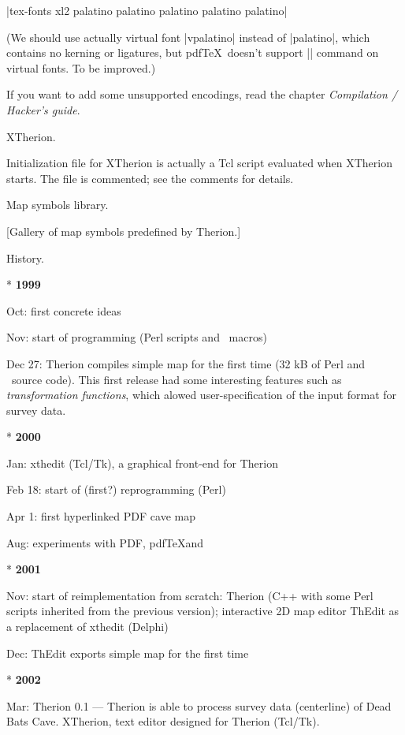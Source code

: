   |tex-fonts xl2 palatino palatino palatino palatino palatino|
  
  (We should use actually virtual font |vpalatino| instead of |palatino|,
  which contains no kerning or ligatures, but
  pdf\TeX\ doesn't support |\pdfincludechars| command on virtual fonts.
  To be improved.)
    
  If you want to add some unsupported encodings, 
  read the chapter {\it Compilation / Hacker's guide}. 
\endlist


\subsubchapter XTherion.

Initialization file for XTherion is actually a Tcl script evaluated when 
XTherion starts. The file is commented; see the comments for details.


%


\subchapter Map symbols library.

[Gallery of map symbols predefined by Therion.]


\subchapter History.

\list
{}
* {\bf 1999}

  Oct: first concrete ideas

  Nov: start of programming (Perl scripts and \MP\ macros)

  Dec 27: Therion compiles simple map for the first time (32 kB of Perl and 
       \MP\ source code). This first release had some interesting features
       such as {\it transformation functions}, which alowed user-specification
       of the input format for survey data.
				
* {\bf 2000}

  Jan: xthedit (Tcl/Tk), a graphical front-end for Therion

  Feb 18: start of (first?) reprogramming (Perl)

  Apr 1: first hyperlinked PDF cave map 

  Aug: experiments with PDF, pdf\TeX and \MP

* {\bf 2001}

  Nov: start of reimplementation from scratch: 
       Therion (C++ with some Perl scripts inherited from the previous version); 
       interactive 2D map editor ThEdit as a replacement of xthedit (Delphi) 

  Dec: ThEdit exports simple map for the first time

* {\bf 2002}

  Mar: Therion 0.1 ---
       Therion is able to process survey data (centerline) of Dead Bats Cave.
       XTherion, text editor designed for Therion (Tcl/Tk).

